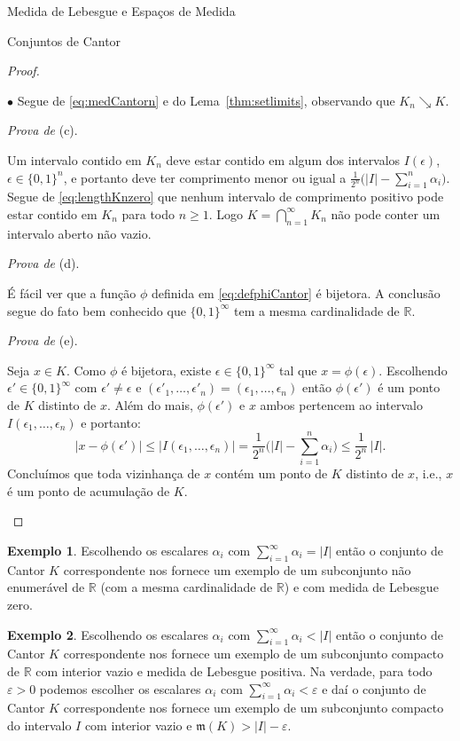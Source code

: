 \documentclass[oneside,final,11pt]{amsbook}
\newcommand{\R}{\mathds R}
\newcommand{\leb}{\mathfrak m}
\newcounter{contador}
\newenvironment{bulletindent}{\setcounter{contador}{0}
\begin{list} {$\bullet$}
{\usecounter{contador}
\setlength{\leftmargin}{10pt}
\setlength{\rightmargin}{10pt}
\setlength{\labelsep}{5pt}
\setlength{\itemsep}{10pt}
\setlength{\topsep}{10pt}}}
{\end{list}}
\theoremstyle{remark}\newtheorem{exercise}{Exercício}[chapter]
\theoremstyle{remark}\newtheorem{*exercise}[exercise]{\hbox to 0pt{\hskip 0pt minus 1fil*}Exercício}
\theoremstyle{definition}\newtheorem{exdefin}{Definição}[chapter]
\theoremstyle{plain}\newtheorem{teo}{Teorema}[section]
\theoremstyle{plain}\newtheorem{lem}[teo]{Lema}
\theoremstyle{plain}\newtheorem{prop}[teo]{Proposição}
\theoremstyle{plain}\newtheorem{cor}[teo]{Corolário}
\theoremstyle{definition}\newtheorem{defin}[teo]{Definição}
\theoremstyle{remark}\newtheorem{rem}[teo]{Observação}
\theoremstyle{definition}\newtheorem{notation}[teo]{Notação}
\theoremstyle{definition}\newtheorem{convention}[teo]{Convenção}
\theoremstyle{definition}\newtheorem{example}[teo]{Exemplo}
\numberwithin{section}{chapter}
\numberwithin{equation}{section}
\begin{document}
\begin{chapter}{Medida de Lebesgue e Espaços de Medida}
\begin{section}{Conjuntos de Cantor}
\begin{proof}
\begin{bulletindent}
Segue de \eqref{eq:medCantorn} e do Lema~\ref{thm:setlimits}, observando que
$K_n\searrow K$.

\item {\em Prova de\/} (c).

Um intervalo contido em $K_n$ deve estar contido em algum dos intervalos $I(\epsilon)$, $\epsilon\in\{0,1\}^n$,
e portanto deve ter comprimento menor ou igual a $\frac1{2^n}\big(\vert I\vert-\sum_{i=1}^n\alpha_i\big)$.
Segue de \eqref{eq:lengthKnzero} que nenhum intervalo de comprimento positivo pode estar contido
em $K_n$ para todo $n\ge1$. Logo $K=\bigcap_{n=1}^\infty K_n$ não pode conter um intervalo
aberto não vazio.

\item {\em Prova de\/} (d).

É fácil ver que a função $\phi$ definida em \eqref{eq:defphiCantor} é bijetora.
A conclusão segue do fato bem conhecido que $\{0,1\}^\infty$ tem a mesma cardinalidade de $\R$.

\item {\em Prova de\/} (e).

Seja $x\in K$. Como $\phi$ é bijetora, existe $\epsilon\in\{0,1\}^\infty$ tal que
$x=\phi(\epsilon)$. Escolhendo $\epsilon'\in\{0,1\}^\infty$ com $\epsilon'\ne\epsilon$
e $(\epsilon'_1,\ldots,\epsilon'_n)=(\epsilon_1,\ldots,\epsilon_n)$ então
$\phi(\epsilon')$ é um ponto de $K$ distinto de $x$. Além do mais,
$\phi(\epsilon')$ e $x$ ambos pertencem ao intervalo $I(\epsilon_1,\ldots,\epsilon_n)$
e portanto:
\[\big\vert x-\phi(\epsilon')\big\vert\le\big\vert I(\epsilon_1,\ldots,\epsilon_n)\big\vert=
\frac1{2^n}\Big(\vert I\vert-\sum_{i=1}^n\alpha_i\Big)\le\frac1{2^n}\,\vert I\vert.\]
Concluímos que toda vizinhança de $x$ contém um ponto de $K$ distinto de $x$, i.e., $x$ é um
ponto de acumulação de $K$.\qedhere
\end{bulletindent}
\end{proof}

\begin{example}
Escolhendo os escalares $\alpha_i$ com $\sum_{i=1}^\infty\alpha_i=\vert I\vert$ então
o conjunto de Cantor $K$ correspondente nos fornece um exemplo de um subconjunto
não enumerável de $\R$ (com a mesma cardinalidade de $\R$) e com medida de Lebesgue zero.
\end{example}

\begin{example}\label{exa:raroquaseI}
Escolhendo os escalares $\alpha_i$ com $\sum_{i=1}^\infty\alpha_i<\vert I\vert$ então o conjunto
de Cantor $K$ correspondente nos fornece um exemplo de um subconjunto compacto de $\R$
com interior vazio e medida de Lebesgue positiva. Na verdade, para todo $\varepsilon>0$
podemos escolher os escalares $\alpha_i$ com $\sum_{i=1}^\infty\alpha_i<\varepsilon$
e daí o conjunto de Cantor $K$ correspondente nos fornece um exemplo de um subconjunto
compacto do intervalo $I$ com interior vazio e $\leb(K)>\vert I\vert-\varepsilon$.
\end{example}


\end{section}
\end{chapter}
\end{document}
